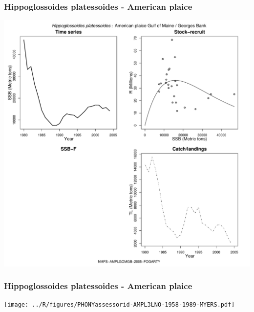 \subsubsection{Hippoglossoides platessoides - American plaice}
\begin{center}
\includegraphics[width=1.2\textwidth]{../R/figures/NMFS-AMPLGOMGB-2005-FOGARTY.pdf}
\end{center}

\subsubsection{Hippoglossoides platessoides - American plaice}
\begin{center}
\texttt{[image: ../R/figures/PHONYassessorid-AMPL3LNO-1958-1989-MYERS.pdf]}
\end{center}

